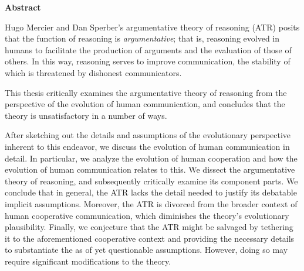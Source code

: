 \begin{center}
    \large \textbf{Abstract}
\end{center}

\noindent Hugo Mercier and Dan Sperber's argumentative theory of reasoning (ATR) posits that the function of reasoning is \emph{argumentative}; that is, reasoning evolved in humans to facilitate the production of arguments and the evaluation of those of others. In this way, reasoning serves to improve communication, the stability of which is threatened by dishonest communicators.

This thesis critically examines the argumentative theory of reasoning
from the perspective of the evolution of human communication, and concludes that the theory is unsatisfactory in a number of ways.

After sketching out the details and assumptions of the evolutionary perspective inherent to this endeavor, we discuss the evolution of human communication in detail. In particular, we analyze the evolution of human cooperation and how the evolution of human communication relates to this.
We dissect the argumentative theory of reasoning, and subsequently critically examine its component parts.
We conclude that in general, the ATR lacks the detail needed to justify its debatable implicit assumptions. Moreover, the ATR is divorced from the broader context of human cooperative communication, which diminishes the theory's evolutionary plausibility.
Finally, we conjecture that the ATR might be salvaged by tethering it to the aforementioned cooperative context and providing the necessary details to substantiate the as of yet questionable assumptions. However, doing so may require significant modifications to the theory.
